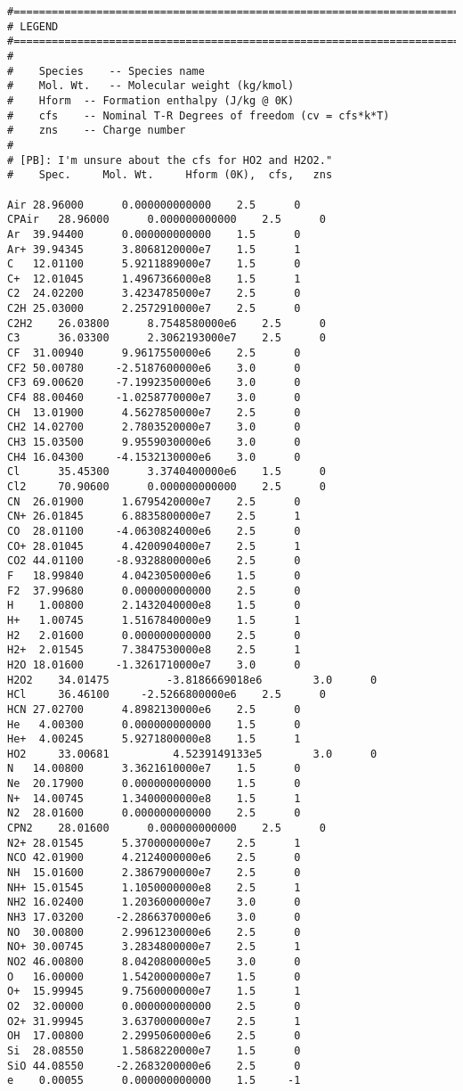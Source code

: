 \linenumbers
\begin{verbatim}
#===========================================================================
# LEGEND
#===========================================================================
#
#    Species 	-- Species name
#    Mol. Wt.	-- Molecular weight (kg/kmol)
#    Hform	-- Formation enthalpy (J/kg @ 0K)
#    cfs	-- Nominal T-R Degrees of freedom (cv = cfs*k*T)
#    zns	-- Charge number
#
# [PB]: I'm unsure about the cfs for HO2 and H2O2."
#    Spec.     Mol. Wt.     Hform (0K),  cfs,   zns

Air	28.96000	  0.000000000000 	2.5 	 0
CPAir	28.96000	  0.000000000000 	2.5 	 0
Ar	39.94400	  0.000000000000 	1.5 	 0
Ar+	39.94345	  3.8068120000e7 	1.5 	 1
C	12.01100	  5.9211889000e7 	1.5 	 0
C+	12.01045	  1.4967366000e8 	1.5 	 1
C2	24.02200	  3.4234785000e7 	2.5 	 0
C2H	25.03000	  2.2572910000e7 	2.5 	 0
C2H2	26.03800	  8.7548580000e6 	2.5 	 0
C3      36.03300	  2.3062193000e7 	2.5 	 0
CF	31.00940	  9.9617550000e6 	2.5 	 0
CF2	50.00780	 -2.5187600000e6 	3.0 	 0
CF3	69.00620	 -7.1992350000e6 	3.0 	 0
CF4	88.00460	 -1.0258770000e7 	3.0 	 0
CH	13.01900	  4.5627850000e7 	2.5 	 0
CH2	14.02700	  2.7803520000e7 	3.0 	 0
CH3	15.03500	  9.9559030000e6 	3.0 	 0
CH4	16.04300	 -4.1532130000e6 	3.0 	 0
Cl      35.45300	  3.3740400000e6 	1.5 	 0
Cl2     70.90600	  0.000000000000 	2.5 	 0
CN	26.01900	  1.6795420000e7 	2.5 	 0
CN+	26.01845	  6.8835800000e7 	2.5 	 1
CO	28.01100	 -4.0630824000e6 	2.5 	 0
CO+	28.01045	  4.4200904000e7 	2.5 	 1
CO2	44.01100	 -8.9328800000e6 	2.5 	 0
F	18.99840	  4.0423050000e6 	1.5 	 0
F2	37.99680	  0.000000000000 	2.5 	 0
H	 1.00800	  2.1432040000e8 	1.5 	 0
H+	 1.00745	  1.5167840000e9 	1.5 	 1
H2	 2.01600	  0.000000000000 	2.5 	 0
H2+	 2.01545	  7.3847530000e8 	2.5 	 1
H2O	18.01600	 -1.3261710000e7 	3.0 	 0
H2O2    34.01475         -3.8186669018e6        3.0      0
HCl     36.46100	 -2.5266800000e6 	2.5 	 0
HCN	27.02700	  4.8982130000e6 	2.5 	 0
He	 4.00300	  0.000000000000 	1.5 	 0
He+	 4.00245	  5.9271800000e8 	1.5 	 1
HO2     33.00681          4.5239149133e5        3.0      0
N	14.00800	  3.3621610000e7 	1.5 	 0
Ne	20.17900	  0.000000000000 	1.5 	 0
N+	14.00745	  1.3400000000e8 	1.5 	 1
N2	28.01600	  0.000000000000 	2.5 	 0
CPN2	28.01600	  0.000000000000 	2.5 	 0
N2+	28.01545	  5.3700000000e7 	2.5 	 1
NCO	42.01900	  4.2124000000e6 	2.5 	 0
NH	15.01600	  2.3867900000e7 	2.5 	 0
NH+	15.01545	  1.1050000000e8 	2.5 	 1
NH2	16.02400	  1.2036000000e7 	3.0 	 0
NH3	17.03200	 -2.2866370000e6 	3.0 	 0
NO	30.00800	  2.9961230000e6 	2.5 	 0
NO+	30.00745	  3.2834800000e7 	2.5 	 1
NO2	46.00800	  8.0420800000e5 	3.0 	 0
O	16.00000	  1.5420000000e7 	1.5 	 0
O+	15.99945	  9.7560000000e7 	1.5 	 1
O2	32.00000	  0.000000000000 	2.5 	 0
O2+	31.99945	  3.6370000000e7 	2.5 	 1
OH	17.00800	  2.2995060000e6 	2.5 	 0
Si	28.08550	  1.5868220000e7 	1.5 	 0
SiO	44.08550	 -2.2683200000e6 	2.5 	 0
e	 0.00055	  0.000000000000 	1.5 	-1
\end{verbatim}
\nolinenumbers

